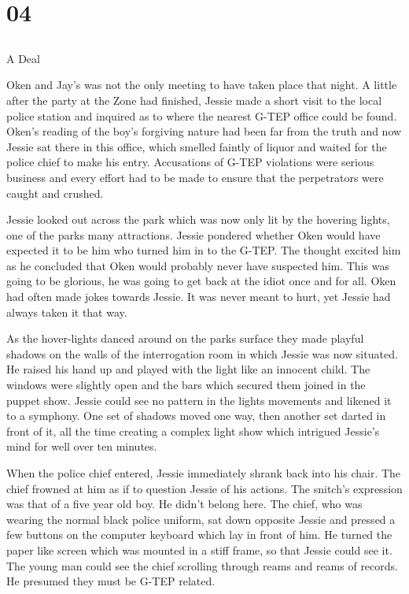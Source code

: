 \chapter{04}
\section{}
A Deal  

Oken and Jay's was not the only meeting to have taken place that night.  A little after the party at the Zone had finished, Jessie made a short visit to the local police station and inquired as to where the nearest G-TEP office could be found.  Oken's reading of the boy's forgiving nature had been far from the truth and now Jessie sat there in this office, which smelled faintly of liquor and waited for the police chief to make his entry.  Accusations of G-TEP violations were serious business and every effort had to be made to ensure that the perpetrators were caught and crushed.  

Jessie looked out across the park which was now only lit by the hovering lights, one of the parks many attractions.  Jessie pondered whether Oken would have expected it to be him who turned him in to the G-TEP.  The thought excited him as he concluded that Oken would probably never have suspected him.  This was going to be glorious, he was going to get back at the idiot once and for all.  Oken had often made jokes towards Jessie.  It was never meant to hurt, yet Jessie had always taken it that way.

As the hover-lights danced around on the parks surface they made playful shadows on the walls of the interrogation room in which Jessie was now situated.  He raised his hand up and played with the light like an innocent child.  The windows were slightly open and the bars which secured them joined in the puppet show.  Jessie could see no pattern in the lights movements and likened it to a symphony.  One set of shadows moved one way, then another set darted in front of it, all the time creating a complex light show which intrigued Jessie's mind for well over ten minutes.

When the police chief entered, Jessie immediately shrank back into his chair.  The chief frowned at him as if to question Jessie of his actions.  The snitch's expression was that of a five year old boy.  He didn't belong here.  The chief, who was wearing the normal black police uniform, sat down opposite Jessie and pressed a few buttons on the computer keyboard which lay in front of him.   He turned the paper like screen which was mounted in a stiff frame, so that Jessie could see it.  The young man could see the chief scrolling through reams and reams of records.  He presumed they must be G-TEP related.

